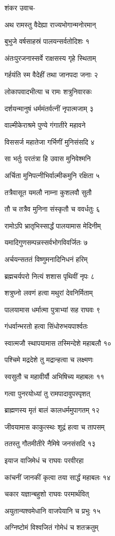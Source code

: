 
शंकर उवाच-

अथ रामस्तु वैदेह्या राज्यभोगान्मनोरमान्

बुभुजे वर्षसाहस्रं पालयन्सर्वतोदिशः १

अंतःपुरजनास्सर्वे राक्षसस्य गृहे स्थिताम्

गर्हयंति स्म वैदेहीं तथा जानपदा जनाः २

लोकापवादभीत्या च रामः शत्रुनिवारकः

दर्शयन्मानुषं धर्ममंतर्वत्नीं नृपात्मजाम् ३

वाल्मीकेराश्रमे पुण्ये गंगातीरे महावने

विससर्ज महातेजा गर्भिणीं मुनिसंसदि ४

सा भर्तुः परतंत्रा हि उवास मुनिवेश्मनि

अर्चिता मुनिपत्नीभिर्वाल्मीकमुनि रक्षिता ५

तत्रैवासूत यमलौ नाम्ना कुशलवौ सुतौ

तौ च तत्रैव मुनिना संस्कृतौ च ववर्धतुः ६

रामोऽपि भ्रातृभिस्सार्द्धं पालयामास मेदिनीम्

यमादिगुणसम्पन्नस्सर्वभोगविवर्जितः ७

अर्चयन्सततं विष्णुमनादिनिधनं हरिम्

ब्रह्मचर्यपरो नित्यं शशास पृथिवीं नृपः ८

शत्रुघ्नो लवणं हत्वा मथुरां देवनिर्मिताम्

पालयामास धर्मात्मा पुत्राभ्यां सह राघवः ९

गंधर्वान्भरतो हत्वा सिंधोरुभयपार्श्वतः

स्वात्मजौ स्थापयामास तस्मिन्देशे महाबलौ १०

पश्चिमे मद्रदेशे तु मद्रान्हत्वा च लक्ष्मणः

स्वसुतौ च महावीर्यौ अभिषिच्य महाबलः ११

गत्वा पुनरयोध्यां तु रामपादावुपस्पृशत्

ब्राह्मणस्य मृतं बालं कालधर्ममुपागतम् १२

जीवयामास काकुत्स्थः शूद्रं हत्वा च तापसम्

ततस्तु गौतमीतीरे नैमिषे जनसंसदि १३

इयाज वाजिमेधं च राघवः परवीरहा

कांचनीं जानकीं कृत्वा तया सार्द्धं महाबलः १४

चकार यज्ञान्बहुशो राघवः परमार्थवित्

अयुतान्यश्वमेधानि वाजपेयानि च प्रभुः १५

अग्निष्टोमं विश्वजितं गोमेधं च शतक्रतुम्

